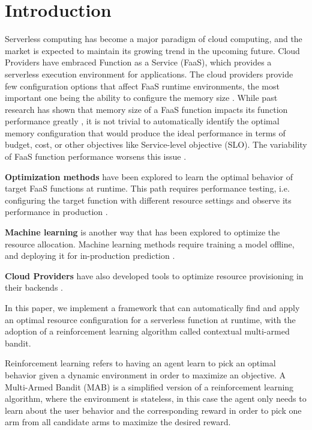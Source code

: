 \documentclass[conference]{IEEEtran}
\begin{document}
\section{Introduction}
Serverless computing has become a major paradigm of cloud computing, and the market is expected to maintain its growing trend in the upcoming future. Cloud Providers have embraced Function as a Service (FaaS), which provides a serverless execution environment for applications. The cloud providers provide few configuration options that affect FaaS runtime environments, the most important one being the ability to configure the memory size \cite{aws-lambda, 10.1145/3429880.3430094}. While past research has shown that memory size of a FaaS function impacts its function performance greatly \cite{10.1145/3464298.3493398}, it is not trivial to automatically identify the optimal memory configuration that would produce the ideal performance in terms of budget, cost, or other objectives like Service-level objective (SLO). The variability of FaaS function performance worsens this issue \cite{10.1145/3429880.3430099}.

\textbf{Optimization methods} have been explored to learn the optimal behavior of target FaaS functions at runtime. This path requires performance testing, i.e. configuring the target function with different resource settings and observe its performance in production \cite{9155363, 8567674, 9860980, 9460548, 10.1007/978-3-031-04718-3_9}.

\textbf{Machine learning} is another way that has been explored to optimize the resource allocation. Machine learning methods require training a model offline, and deploying it for in-production prediction \cite{10.1145/3464298.3493398}.

\textbf{Cloud Providers} have also developed tools to optimize resource provisioning in their backends \cite{10.1145/3552326.3567496, aws_operating_lambda_performance_optimization}.

In this paper, we implement a framework that can automatically find and apply an optimal resource configuration for a serverless function at runtime, with the adoption of a reinforcement learning algorithm called contextual multi-armed bandit.

Reinforcement learning refers to having an agent learn to pick an optimal behavior given a dynamic environment in order to maximize an objective. A Multi-Armed Bandit (MAB) is a simplified version of a reinforcement learning algorithm, where the environment is stateless, in this case the agent only needs to learn about the user behavior and the corresponding reward in order to pick one arm from all candidate arms to maximize the desired reward.
\end{document}
